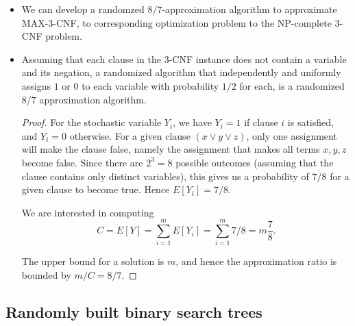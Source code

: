 \begin{itemize}
\item We can develop a randomzed $8/7$-approximation algorithm to
  approximate MAX-3-CNF, to corresponding optimization problem to the
  NP-complete 3-CNF problem.

\item Assuming that each clause in the 3-CNF instance does not contain
  a variable and its negation, a randomized algorithm that
  independently and uniformly assigns $1$ or $0$ to each variable with
  probability $1/2$ for each, is a randomized $8/7$ approximation
  algorithm.
  \begin{proof}
    For the stochastic variable $Y_i$, we have $Y_i = 1$ if clause $i$
    is satisfied, and $Y_i = 0$ otherwise.  For a given clause $(x
    \lor y \lor z)$, only one assignment will make the clause false,
    namely the assignment that makes all terms $x,y,z$ become
    false. Since there are $2^3 = 8$ possible outcomes (assuming that
    the clause contains only distinct variables), this gives us a
    probability of $7/8$ for a given clause to become true. Hence
    $E[Y_i] = 7/8$.

    We are interested in computing
    $$
    C = E[Y] = \sum_{i=1}^m E[Y_i] = \sum_{i=1}^m 7/8 = m \frac{7}{8}.
    $$

    The upper bound for a solution is $m$, and hence the approximation
    ratio is bounded by $m / C = 8/7$.
  \end{proof}
\end{itemize}

\subsection{Randomly built binary search trees}

